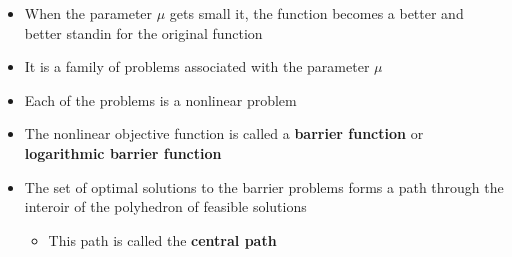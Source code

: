 \documentclass[11pt]{article}
\begin{document}
\begin{itemize}
\item When the parameter \(\mu\) gets small it, the function becomes a better and better standin for the original function
\item It is a family of problems associated with the parameter \(\mu\)
\item Each of the problems is a nonlinear problem
\item The nonlinear objective function is called a \textbf{barrier function} or \textbf{logarithmic barrier function}
\item The set of optimal solutions to the barrier problems forms a path through the interoir of the polyhedron of feasible solutions
\begin{itemize}
\item This path is called the \textbf{central path}
\end{itemize}
\end{itemize}
\end{document}
